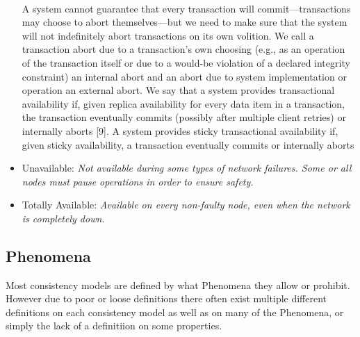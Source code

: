 \documentclass[a4paper,10pt,titlepage]{report}
\begin{document}
\begin{itemize}
{     \vspace*{4mm}\\
    A system cannot guarantee that every transaction will commit—transactions may choose to abort themselves—but we need to make    sure that the system will not indefinitely abort transactions on its    own volition. We call a transaction abort due to a transaction's own    choosing (e.g., as an operation of the transaction itself or due to    a would-be violation of a declared integrity constraint) an internal    abort and an abort due to system implementation or operation an    external abort. We say that a system provides transactional availability if, given replica availability for every data item in a transaction, the transaction eventually commits (possibly after multiple    client retries) or internally aborts [9]. A system provides sticky    transactional availability if, given sticky availability, a transaction eventually commits or internally aborts}\cite{HighlyAvailableTransactionsVirtuesandLimitations}

        \item Unavailable: \textit{Not available during some types of network failures. Some or all nodes must pause operations in order to ensure safety.}
        \item Totally Available: \textit{Available on every non-faulty node, even when the network is completely down.}


    \end{itemize}

    \subsection{Phenomena}
    Most consistency models are defined by what Phenomena they allow or prohibit. However due to poor or loose definitions there often exist multiple different definitions on each consistency model as well as on many of the Phenomena, or simply the lack of a definitiion on some properties.

\end{document}
